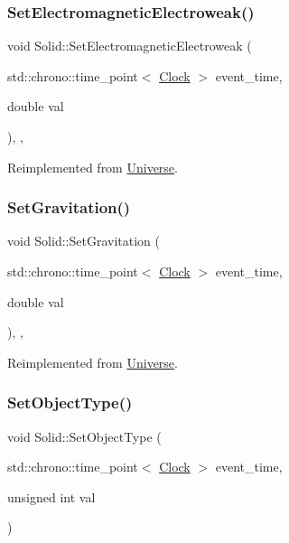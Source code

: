 \subsubsection{\texorpdfstring{Set\+Electromagnetic\+Electroweak()}{SetElectromagneticElectroweak()}}
{\footnotesize\ttfamily void Solid\+::\+Set\+Electromagnetic\+Electroweak (\begin{DoxyParamCaption}\item[{std\+::chrono\+::time\+\_\+point$<$ \mbox{\hyperlink{universe_8h_a0ef8d951d1ca5ab3cfaf7ab4c7a6fd80}{Clock}} $>$}]{event\+\_\+time,  }\item[{double}]{val }\end{DoxyParamCaption})\hspace{0.3cm}{\ttfamily [inline]}, {\ttfamily [final]}, {\ttfamily [virtual]}}



Reimplemented from \mbox{\hyperlink{classUniverse_a608aa95698380f791a0ffba45cc1bee3}{Universe}}.

\mbox{\label{classSolid_ae237f2c713868c133e28ed7f75fc9125}} 
\subsubsection{\texorpdfstring{Set\+Gravitation()}{SetGravitation()}}
{\footnotesize\ttfamily void Solid\+::\+Set\+Gravitation (\begin{DoxyParamCaption}\item[{std\+::chrono\+::time\+\_\+point$<$ \mbox{\hyperlink{universe_8h_a0ef8d951d1ca5ab3cfaf7ab4c7a6fd80}{Clock}} $>$}]{event\+\_\+time,  }\item[{double}]{val }\end{DoxyParamCaption})\hspace{0.3cm}{\ttfamily [inline]}, {\ttfamily [final]}, {\ttfamily [virtual]}}



Reimplemented from \mbox{\hyperlink{classUniverse_ae0cb8d86b2fbb8396d605160344b42f5}{Universe}}.

\mbox{\label{classSolid_af6fe46af0be9a9533e114b1c0f186bfc}} 
\subsubsection{\texorpdfstring{Set\+Object\+Type()}{SetObjectType()}}
{\footnotesize\ttfamily void Solid\+::\+Set\+Object\+Type (\begin{DoxyParamCaption}\item[{std\+::chrono\+::time\+\_\+point$<$ \mbox{\hyperlink{universe_8h_a0ef8d951d1ca5ab3cfaf7ab4c7a6fd80}{Clock}} $>$}]{event\+\_\+time,  }\item[{unsigned int}]{val }\end{DoxyParamCaption})}

